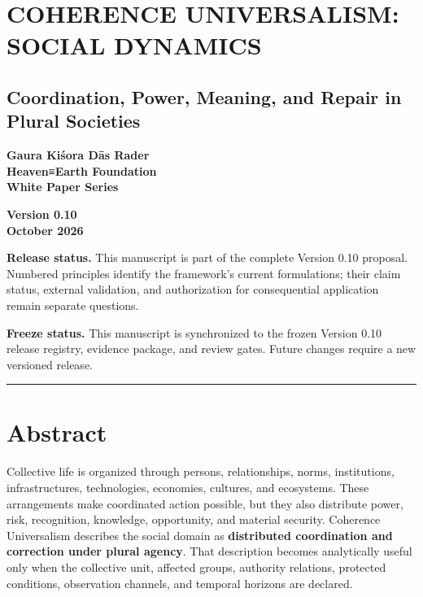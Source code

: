 \documentclass[
  11pt,
]{article}
\author{}
\date{}
\begin{document}
\section{COHERENCE UNIVERSALISM: SOCIAL
DYNAMICS}\label{coherence-universalism-social-dynamics}

\subsection{Coordination, Power, Meaning, and Repair in Plural
Societies}\label{coordination-power-meaning-and-repair-in-plural-societies}

\textbf{Gaura Kiśora Dās Rader}\\
\textbf{Heaven≡Earth Foundation}\\
\textbf{White Paper Series}

\textbf{Version 0.10}\\
\textbf{October 2026}

\textbf{Release status.} This manuscript is part of the complete Version
0.10 proposal. Numbered principles identify the framework's current
formulations; their claim status, external validation, and authorization
for consequential application remain separate questions.

\textbf{Freeze status.} This manuscript is synchronized to the frozen
Version 0.10 release registry, evidence package, and review gates.
Future changes require a new versioned release.

\begin{center}\rule{0.5\linewidth}{0.5pt}\end{center}

\section{Abstract}\label{abstract}

Collective life is organized through persons, relationships, norms,
institutions, infrastructures, technologies, economies, cultures, and
ecosystems. These arrangements make coordinated action possible, but
they also distribute power, risk, recognition, knowledge, opportunity,
and material security. Coherence Universalism describes the social
domain as \textbf{distributed coordination and correction under plural
agency}. That description becomes analytically useful only when the
collective unit, affected groups, authority relations, protected
conditions, observation channels, and temporal horizons are declared.
\end{document}

